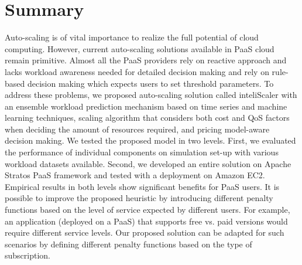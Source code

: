 \section{Summary}

Auto-scaling is of vital importance to realize the full potential of cloud computing. However, current auto-scaling solutions available in PaaS cloud remain primitive. Almost all the PaaS providers rely on reactive approach and lacks workload awareness needed for detailed decision making and rely on rule-based decision making which expects users to set threshold parameters. To address these problems, we proposed auto-scaling solution called inteliScaler with an ensemble workload prediction mechanism based on time series and machine learning techniques, scaling algorithm that considers both cost and QoS factors when deciding the amount of resources required, and pricing model-aware decision making. We tested the proposed model in two levels. First, we evaluated the performance of individual components on simulation set-up with various workload datasets available. Second, we developed an entire solution on Apache Stratos PaaS framework and tested with a deployment on Amazon EC2. Empirical results in both levels show significant benefits for PaaS users. It is possible to improve the proposed heuristic by introducing different penalty functions  based on the level of service expected by different users. For example, an application (deployed on a PaaS) that supports free vs. paid versions would require different service levels. Our proposed solution can be adapted for such scenarios by defining different penalty functions based on the type of subscription.\\